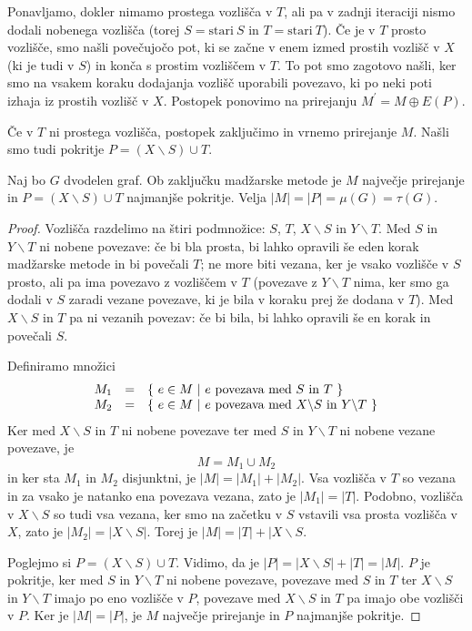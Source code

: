 \documentclass[11pt, a4paper]{article}
\begin{document}
    Ponavljamo, dokler nimamo prostega vozlišča v \(T\), ali pa v zadnji iteraciji nismo dodali nobenega vozlišča (torej \(S = \text{stari}\ S\) in \(T = \text{stari}\ T\)). Če je v \(T\) prosto vozlišče, smo našli povečujočo pot, ki se začne v enem izmed prostih vozlišč v \(X\) (ki je tudi v \(S\)) in konča s prostim vozliščem v \(T\). To pot smo zagotovo našli, ker smo na vsakem koraku dodajanja vozlišč uporabili povezavo, ki po neki poti izhaja iz prostih vozlišč v \(X\). Postopek ponovimo na prirejanju \(M^\prime = M \oplus E(P)\).
    \par
    Če v \(T\) ni prostega vozlišča, postopek zaključimo in vrnemo prirejanje \(M\). Našli smo tudi pokritje \(P=(X \backslash S) \cup T\).

    \begin{theorem}
        Naj bo \(G\) dvodelen graf. Ob zaključku madžarske metode je \(M\) največje prirejanje in \(P=(X \backslash S) \cup T\) najmanjše pokritje. Velja \(|M|=|P|=\mu(G)=\tau(G)\).
    \end{theorem}

    \begin{proof}
        Vozlišča razdelimo na štiri podmnožice: \(S\), \(T\), \(X \backslash S\) in \(Y \backslash T\). Med \(S\) in \(Y \backslash T\) ni nobene povezave: če bi bla prosta, bi lahko opravili še eden korak madžarske metode in bi povečali \(T\); ne more biti vezana, ker je vsako vozlišče v \(S\) prosto, ali pa ima povezavo z vozliščem v \(T\) (povezave z \(Y \backslash T\) nima, ker smo ga dodali v \(S\) zaradi vezane povezave, ki je bila v koraku prej že dodana v \(T\)). Med \(X \backslash S\) in \(T\) pa ni vezanih povezav: če bi bila, bi lahko opravili še en korak in povečali \(S\). 
        \par
        Definiramo množici
        \[
            \begin{array}{l l l}
                M_1 & = & \{\ e \in M\ |\ e\ \text{povezava med}\ S\ \text{in}\ T\ \} \\
                M_2 & = & \{\ e \in M\ |\ e\ \text{povezava med}\ X \backslash S\ \text{in}\ Y \backslash T\ \}
            \end{array}
        \]
        Ker med \(X \backslash S\) in \(T\) ni nobene povezave ter med \(S\) in \(Y \backslash T\) ni nobene vezane povezave, je
        \[
            M = M_1 \cup M_2
        \]
        in ker sta \(M_1\) in \(M_2\) disjunktni, je \(|M|=|M_1|+|M_2|\). Vsa vozlišča v \(T\) so vezana in za vsako je natanko ena povezava vezana, zato je \(|M_1|=|T|\). Podobno, vozlišča v \(X \backslash S\) so tudi vsa vezana, ker smo na začetku v \(S\) vstavili vsa prosta vozlišča v \(X\), zato je \(|M_2|=|X \backslash S|\). Torej je \(|M|=|T| + |X \backslash S\).
        \par
        Poglejmo si \(P=(X \backslash S) \cup T\). Vidimo, da je \(|P|=|X \backslash S| + |T| = |M|\). \(P\) je pokritje, ker med \(S\) in \(Y \backslash T\) ni nobene povezave, povezave med \(S\) in \(T\) ter \(X \backslash S\) in \(Y \backslash T\) imajo po eno vozlišče v \(P\), povezave med \(X \backslash S\) in \(T\) pa imajo obe vozlišči v \(P\). Ker je \(|M|=|P|\), je \(M\) največje prirejanje in \(P\) najmanjše pokritje.
    \end{proof}
\end{document}
